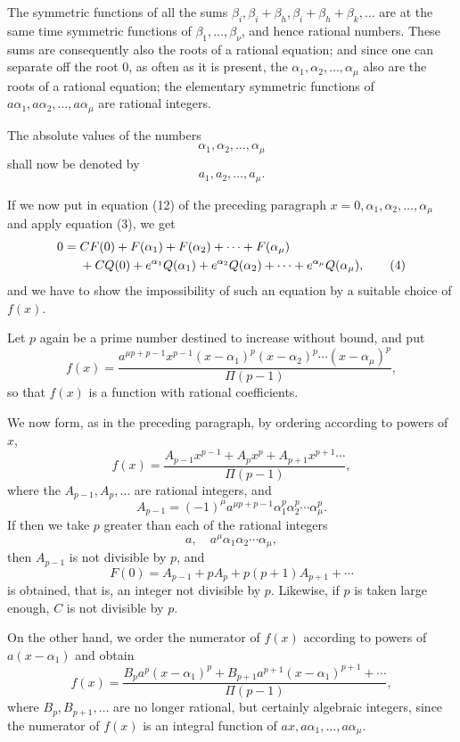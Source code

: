 \documentclass[11pt]{article}
\begin{document}
The symmetric functions of all the sums $\beta_i,\beta_i+\beta_h,\beta_i+\beta_h+\beta_k,\ldots$ are at the same time symmetric functions of $\beta_1,\ldots,\beta_\nu$, and hence rational numbers. These sums are consequently also the roots of a rational equation; and since one can separate off the root 0, as often as it is present, the $\alpha_1,\alpha_2,\ldots,\alpha_\mu$ also are the roots of a rational equation; the elementary symmetric functions of $a\alpha_1,a\alpha_2,\ldots,a\alpha_\mu$ are rational integers.

The absolute values of the numbers
\[
\alpha_1,\alpha_2,\ldots,\alpha_\mu
\]
shall now be denoted by
\[
a_1,a_2,\ldots,a_\mu .
\]

If we now put in equation (12) of the preceding paragraph $x=0,\alpha_1,\alpha_2,\ldots,\alpha_\mu$ and apply equation (3), we get
\begin{align}
0={}&CF(0)+F(\alpha_1)+F(\alpha_2)+\cdots+F(\alpha_\mu)\notag\\
&+CQ(0)+e^{\alpha_1}Q(\alpha_1)+e^{\alpha_2}Q(\alpha_2)+\cdots+e^{\alpha_\mu}Q(\alpha_\mu),
\tag{4}
\end{align}
and we have to show the impossibility of such an equation by a suitable choice of $f(x)$.

Let $p$ again be a prime number destined to increase without bound, and put
\begin{equation}\tag{5}
f(x)=
\frac{a^{\mu p+p-1}x^{p-1}(x-\alpha_1)^p(x-\alpha_2)^p\cdots(x-\alpha_\mu)^p}{\Pi(p-1)},
\end{equation}
so that $f(x)$ is a function with rational coefficients.

We now form, as in the preceding paragraph, by ordering according to powers of $x$,
\[
f(x)=\frac{A_{p-1}x^{p-1}+A_px^p+A_{p+1}x^{p+1}\cdots}{\Pi(p-1)},
\]
where the $A_{p-1},A_p,\ldots$ are rational integers, and
\[
A_{p-1}=(-1)^\mu a^{\mu p+p-1}\alpha_1^p\alpha_2^p\cdots\alpha_\mu^p.
\]
If then we take $p$ greater than each of the rational integers
\[
a,\quad a^\mu\alpha_1\alpha_2\cdots\alpha_\mu,
\]
then $A_{p-1}$ is not divisible by $p$, and
\[
F(0)=A_{p-1}+pA_p+p(p+1)A_{p+1}+\cdots
\]
is obtained, that is, an integer not divisible by $p$. Likewise, if $p$ is taken large enough, $C$ is not divisible by $p$.

On the other hand, we order the numerator of $f(x)$ according to powers of $a(x-\alpha_1)$ and obtain
\[
f(x)=\frac{B_pa^p(x-\alpha_1)^p+B_{p+1}a^{p+1}(x-\alpha_1)^{p+1}+\cdots}{\Pi(p-1)},
\]
where $B_p,B_{p+1},\ldots$ are no longer rational, but certainly algebraic integers, since the numerator of $f(x)$ is an integral function of $ax,a\alpha_1,\ldots,a\alpha_\mu$.
\end{document}
